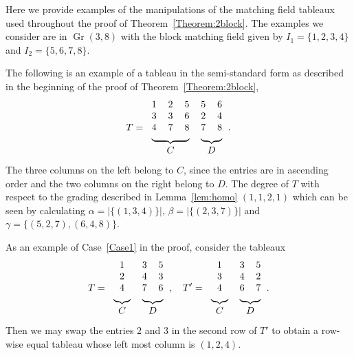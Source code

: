 \documentclass[ALCO,ThmDefs,Unicode,epreuves]{cedram}
\DeclareMathOperator{\Gr}{Gr}
\begin{document}
\begin{exam} \label{example:thm2blockillustration}
Here we provide examples of the manipulations of the matching field tableaux used throughout the proof of Theorem~\ref{Theorem:2block}. 
The examples we consider are in $\Gr(3,8)$ with the block matching field given by $I_1 = \{1,2,3,4 \}$ and $I_2 = \{5,6,7,8\}$.


The following is an example of a tableau in the semi-standard form as described in the beginning of the proof of Theorem~\ref{Theorem:2block}, 
\[
T = 
\begin{tabular}{ccccc}
 1 & 2 & 5 & 5 & 6 \\
 3 & 3 & 6 & 2 & 4 \\
 4 & 7 & 8 & 7 & 8 \\
 \multicolumn{3}{c}{\upbracefill} & \multicolumn{2}{c}{\upbracefill}\\
 \multicolumn{3}{c}{$C$} & \multicolumn{2}{c}{$D$}\\
\end{tabular}.
\]
The three columns on the left belong to $C$, since the entries are in ascending order and the two columns on the right belong to $D$. The degree of $T$ with respect to the grading described in Lemma~\ref{lem:homo} $(1,1,2,1)$ which can be seen by calculating $\alpha = |\{(1,3,4)\}|$, $\beta = |\{(2,3,7)\}|$ and $\gamma = \{(5,2,7), (6,4,8)\}$. 


As an example of Case~\ref{Case1} in the proof, consider the tableaux
\[
T = 
\begin{tabular}{ccc}
 1 & 3 & 5 \\
 2 & 4 & 3 \\
 4 & 7 & 6 \\
 \multicolumn{1}{c}{\upbracefill} & \multicolumn{2}{c}{\upbracefill}\\
 \multicolumn{1}{c}{$C$} & \multicolumn{2}{c}{$D$}\\
\end{tabular}, 
\quad
T' = 
\begin{tabular}{ccc}
 1 & 3 & 5 \\
 3 & 4 & 2 \\
 4 & 6 & 7 \\
 \multicolumn{1}{c}{\upbracefill} & \multicolumn{2}{c}{\upbracefill}\\
 \multicolumn{1}{c}{$C$} & \multicolumn{2}{c}{$D$}\\
\end{tabular}.
\]
Then we may swap the entries $2$ and $3$ in the second row of $T'$ to obtain a row-wise equal tableau whose left most column is $(1,2,4)$. 


\end{exam}
\end{document}
